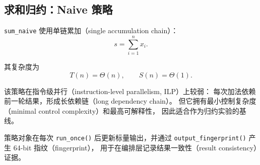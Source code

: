 \subsection{求和归约：Naive 策略}

\texttt{sum\_naive} 使用单链累加（single accumulation chain）：
\begin{equation}
 s = \sum_{i=1}^{n} x_i.
\end{equation}

其复杂度为
\begin{equation}
T(n)=\Theta(n),\qquad S(n)=\Theta(1).
\end{equation}

该策略在指令级并行（instruction-level parallelism, ILP）上较弱：
每次加法依赖前一轮结果，形成长依赖链（long dependency chain）。
但它拥有最小控制复杂度（minimal control complexity）和最高可解释性，
因此适合作为归约实验的基线。

策略对象在每次 \texttt{run\_once()} 后更新标量输出，并通过
\texttt{output\_fingerprint()} 产生 64-bit 指纹（fingerprint），
用于在编排层记录结果一致性（result consistency）证据。
